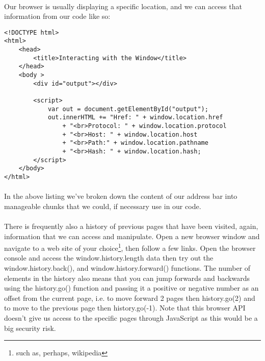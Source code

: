 \documentclass[10pt, a4paper]{article}
\begin{document}
\paragraph{} Our browser is usually displaying a specific location, and we can access that information from our code like so:

\begin{lstlisting}
<!DOCTYPE html>
<html>
    <head>
        <title>Interacting with the Window</title>
    </head>
    <body >
        <div id="output"></div>

        <script>
            var out = document.getElementById("output");
            out.innerHTML += "Href: " + window.location.href 
                + "<br>Protocol: " + window.location.protocol
                + "<br>Host: " + window.location.host
                + "<br>Path:" + window.location.pathname
                + "<br>Hash: " + window.location.hash;
        </script>
    </body>
</html>
\end{lstlisting}

\paragraph{} In the above listing we've broken down the content of our address bar into manageable chunks that we could, if necessary use in our code. 

\paragraph{} There is frequently also a history of previous pages that have been visited, again, information that we can access and manipulate. Open a new browser window and navigate to a web site of your choice\footnote{such as, perhaps, wikipedia}, then follow a few links. Open the browser console and access the window.history.length data then try out the window.history.back(), and window.history.forward() functions. The number of elements in the history also means that you can jump forwards and backwards using the history.go() function and passing it a positive or negative number as an offset from the current page, i.e. to move forward 2 pages then history.go(2) and to move to the previous page then history.go(-1). Note that this browser API doesn't give us access to the specific pages through JavaScript as this would be a big security risk.


\end{document}

